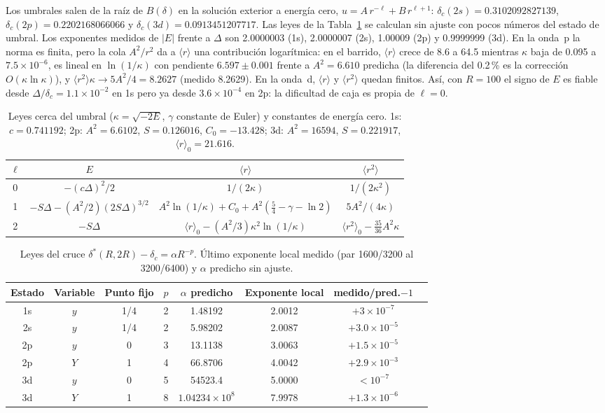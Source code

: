 \documentclass[10pt,letterpaper]{article}
\newcommand{\dc}{\delta_c}
\newcommand{\mr}{\langle r\rangle}
\newcommand{\ee}[2]{#1\times10^{#2}}
\begin{document}
Los umbrales salen de la raíz de $B(\delta)$ en la solución exterior a energía cero, $u=A\,r^{-\ell}+B\,r^{\ell+1}$: $\dc(2s)=0.3102092827139$, $\dc(2p)=0.2202168066066$ y $\dc(3d)=0.0913451207717$. Las leyes de la Tabla~\ref{tab:leyes} se calculan sin ajuste con pocos números del estado de umbral. Los exponentes medidos de $|E|$ frente a $\Delta$ son 2.0000003 (1s), 2.0000007 (2s), 1.00009 (2p) y 0.9999999 (3d). En la onda~p la norma es finita, pero la cola $A^2/r^2$ da a $\mr$ una contribución logarítmica: en el barrido, $\mr$ crece de 8.6 a 64.5 mientras $\kappa$ baja de 0.095 a $\ee{7.5}{-6}$, es lineal en $\ln(1/\kappa)$ con pendiente $6.597\pm0.001$ frente a $A^2=6.610$ predicha (la diferencia del 0.2\,\% es la corrección $O(\kappa\ln\kappa)$), y $\langle r^2\rangle\kappa\to5A^2/4=8.2627$ (medido 8.2629). En la onda~d, $\mr$ y $\langle r^2\rangle$ quedan finitos. Así, con $R=100$ el signo de $E$ es fiable desde $\Delta/\dc=\ee{1.1}{-2}$ en 1s pero ya desde $\ee{3.6}{-4}$ en 2p: la dificultad de caja es propia de $\ell=0$.

\begin{table}[t]
\centering\small
\caption{Leyes cerca del umbral ($\kappa=\sqrt{-2E}$, $\gamma$ constante de Euler) y constantes de energía cero. 1s: $c=0.741192$; 2p: $A^2=6.6102$, $S=0.126016$, $C_0=-13.428$; 3d: $A^2=16594$, $S=0.221917$, $\mr_0=21.616$.}\label{tab:leyes}
\begin{tabular}{cccc}
\toprule
$\ell$ & $E$ & $\mr$ & $\langle r^2\rangle$\\
\midrule
0 & $-(c\Delta)^2/2$ & $1/(2\kappa)$ & $1/(2\kappa^2)$\\
1 & $-S\Delta-(A^2/2)(2S\Delta)^{3/2}$ & $A^2\ln(1/\kappa)+C_0+A^2(\tfrac54-\gamma-\ln2)$ & $5A^2/(4\kappa)$\\
2 & $-S\Delta$ & $\mr_0-(A^2/3)\kappa^2\ln(1/\kappa)$ & $\langle r^2\rangle_0-\tfrac{35}{36}A^2\kappa$\\
\bottomrule
\end{tabular}
\end{table}

\begin{table}[t]
\centering\small
\caption{Leyes del cruce $\delta^*(R,2R)-\dc=\alpha R^{-p}$. Último exponente local medido (par 1600/3200 al 3200/6400) y $\alpha$ predicho sin ajuste.}\label{tab:leyes_cruce}
\begin{tabular}{cccccccc}
\toprule
Estado & Variable & Punto fijo & $p$ & $\alpha$ predicho & Exponente local & medido/pred.$-1$\\
\midrule
1s & $y$ & 1/4 & 2 & 1.48192 & 2.0012 & $+\ee{3}{-7}$\\
2s & $y$ & 1/4 & 2 & 5.98202 & 2.0087 & $+\ee{3.0}{-5}$\\
2p & $y$ & 0 & 3 & 13.1138 & 3.0063 & $+\ee{1.5}{-5}$\\
2p & $Y$ & 1 & 4 & 66.8706 & 4.0042 & $+\ee{2.9}{-3}$\\
3d & $y$ & 0 & 5 & 54523.4 & 5.0000 & $<10^{-7}$\\
3d & $Y$ & 1 & 8 & $\ee{1.04234}{8}$ & 7.9978 & $+\ee{1.3}{-6}$\\
\bottomrule
\end{tabular}
\end{table}
\end{document}
